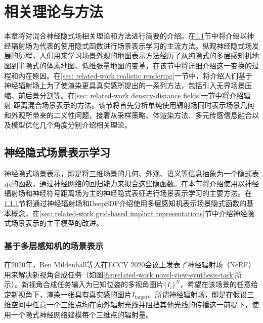 \chapter{相关理论与方法}
\label{chapter:related-work}
本章将对混合神经隐式场相关理论和方法进行简要的介绍。在\ref{sec: related-work implicit scene representation learning}节中将介绍以神经辐射场\cite{mildenhall_nerf_2020}为代表的使用隐式函数进行场景表示学习的主流方法。纵观神经隐式场发展的历程，人们用来学习场景外观的地图表示方法经历了从纯隐式的多层感知机地图到半隐式的体素地图、低维张量地图的变革，在该节中将详细介绍这一变换的过程和内在原因。在\ref{sec: related-work realistic rendering}一节中，将介绍人们基于神经辐射场上为了使渲染更具真实感所提出的一系列方法，包括引入无界场景压缩、前后景分割等。在\ref{sec: related-work density-distance fields}一节中将介绍辐射-距离混合场景表示的方法。该节将首先分析单纯使用辐射场同时表示场景几何和外观所带来的二义性问题，接着从采样策略、体渲染方法、多元传感信息融合以及模型优化几个角度分别介绍相关理论。

\section{神经隐式场景表示学习}
\label{sec: related-work implicit scene representation learning}

神经隐式场景表示，即是将三维场景的几何、外观、语义等信息抽象为一个隐式表示的函数，通过神经网络的回归能力来拟合这些隐函数。在本节将介绍使用以神经辐射场和神经符号距离场为主的神经隐式表征进行场景表示学习的主要方法。在\ref{sec: related-work MLP-based neural implicit representations}节将通过神经辐射场和DeepSDF介绍使用多层感知机表示场景隐式函数的基本概念，在\ref{sec: related-work grid-based implicit representations}节中介绍神经隐式场景表示的主干模型的改进。


\subsection{基于多层感知机的场景表示}
\label{sec: related-work MLP-based neural implicit representations}

在2020年，Ben Mildenhall等人在ECCV 2020会议上发表了神经辐射场\cite{mildenhall_nerf_2020}（NeRF）用来解决新视角合成任务（如图\ref{fig:related-work novel-view-synthesis-task}所示）。新视角合成任务输入为已知位姿的多视角图片$\{{I}_i\}^N$，希望在该场景的任意给定新视角下，渲染一张具有真实感的图片${I}_\text{target}$。所谓神经辐射场，即是在假设三维空间中任意一个三维点均在向外辐射光线并阻挡其他光线的传播这一前提下，使用一个隐式神经网络建模每个三维点的辐射量。

